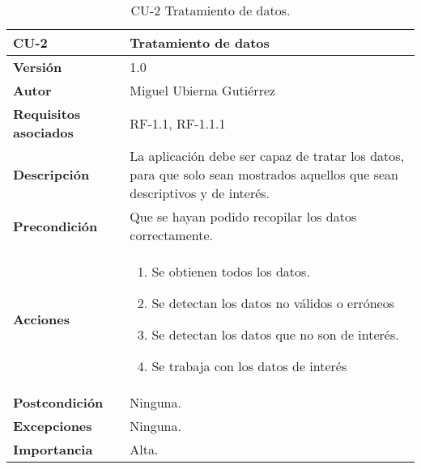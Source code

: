\begin{table}[p]
	\centering
	\begin{tabularx}{\linewidth}{ p{} p{} }
		\toprule
		\textbf{CU-2}    & \textbf{Tratamiento de datos}\\
		\toprule
		\textbf{Versión}              & 1.0    \\
		\textbf{Autor}                & Miguel Ubierna Gutiérrez \\
		\textbf{Requisitos asociados} & RF-1.1, RF-1.1.1 \\
		\textbf{Descripción}          & La aplicación debe ser capaz de tratar los datos, para que solo sean mostrados aquellos que sean descriptivos y de interés. \\
		\textbf{Precondición}         & Que se hayan podido recopilar los datos correctamente. \\
		\textbf{Acciones}             &
		\begin{enumerate}
			\def\labelenumi{\arabic{enumi}.}
			\tightlist
			\item Se obtienen todos los datos.
			\item Se detectan los datos no válidos o erróneos
                \item Se detectan los datos que no son de interés.
                \item Se trabaja con los datos de interés
		\end{enumerate}\\
		\textbf{Postcondición}        & Ninguna. \\
		\textbf{Excepciones}          & Ninguna. \\
		\textbf{Importancia}          & Alta.  \\
		\bottomrule
	\end{tabularx}
	\caption{CU-2 Tratamiento de datos.}
\end{table}


